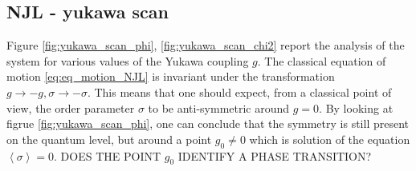 \subsection{NJL - yukawa scan}
Figure \ref{fig:yukawa_scan_phi}, \ref{fig:yukawa_scan_chi2} report the analysis of the system for various values of the Yukawa coupling $g$. The classical equation of motion \eqref{eq:eq_motion_NJL} is invariant under the transformation $g \to -g, \sigma \to -\sigma$. This means that one should expect, from a classical point of view, the order parameter $\sigma$ to be anti-symmetric around $g = 0$. By looking at figrue \ref{fig:yukawa_scan_phi}, one can conclude that the symmetry is still present on the quantum level, but around a point $g_0 \neq 0$ which is solution of the equation $\left\langle \sigma \right\rangle = 0$. DOES THE POINT $g_0$ IDENTIFY A PHASE TRANSITION?

